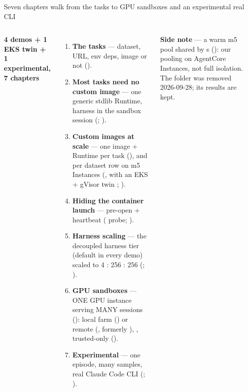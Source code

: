\begin{frame}{Seven chapters walk from the tasks to GPU sandboxes and an experimental real CLI}
\begin{columns}[T]
{\footnotesize\textbf{4 demos + 1 EKS twin + 1 experimental, 7 chapters}\par}
\begin{enumerate}\scriptsize\setlength{\itemsep}{0.8mm}
\item \textbf{The tasks} --- dataset, URL, env deps, image or not ().
\item \textbf{Most tasks need no custom image} --- one generic stdlib Runtime, harness in the sandbox session (; ).
\item \textbf{Custom images at scale} --- one image + Runtime per task (), and per dataset row on m5 Instances (, with an EKS + gVisor twin ; ).
\item \textbf{Hiding the container launch} --- pre-open + heartbeat ( probe; ).
\item \textbf{Harness scaling} --- the decoupled harness tier (default in every demo) scaled to 4 : 256 : 256 (; ).
\item \textbf{GPU sandboxes} --- ONE GPU instance serving MANY sessions (): local farm () or remote  (, formerly ), , trusted-only ().
\item \textbf{Experimental} --- one episode, many samples, real Claude Code CLI (; ).
\end{enumerate}
\colorbox{panel}{\parbox{\dimexpr\linewidth-2\fboxsep}{\scriptsize\textbf{Side note} --- a warm m5 pool shared by s (): our pooling on AgentCore Instances, not full isolation. The  folder was removed 2026-09-28; its results are kept.}}
\vspace{3mm}
\end{columns}
\end{frame}

